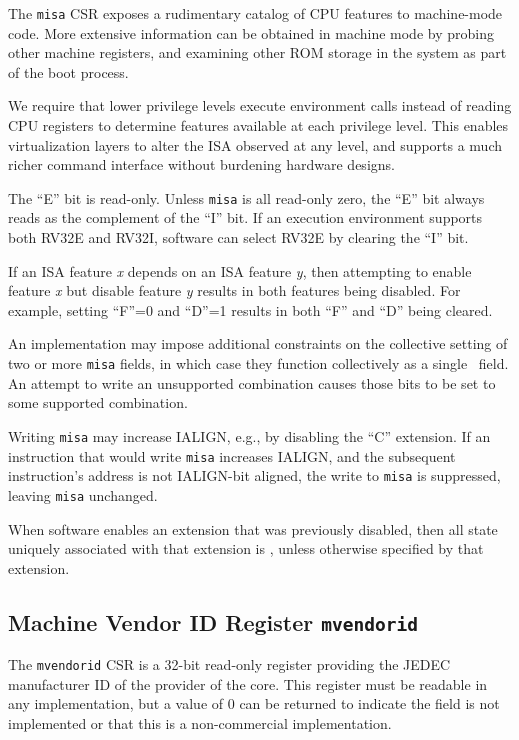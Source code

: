 \begin{commentary}
The {\tt misa} CSR exposes a rudimentary catalog of CPU features
to machine-mode code.  More extensive information can be obtained in
machine mode by probing other machine registers, and examining other
ROM storage in the system as part of the boot process.

We require that lower privilege levels execute environment calls
instead of reading CPU registers to determine features available at
each privilege level. This enables virtualization layers to alter the
ISA observed at any level, and supports a much richer command
interface without burdening hardware designs.
\end{commentary}

The ``E'' bit is read-only.  Unless {\tt misa} is all read-only zero, the ``E''
bit always reads as the complement of the ``I'' bit.
If an execution environment supports both RV32E and RV32I,
software can select RV32E by clearing the ``I'' bit.

If an ISA feature {\em x} depends on an ISA feature {\em y}, then attempting
to enable feature {\em x} but disable feature {\em y} results in both features
being disabled.  For example, setting ``F''=0 and ``D''=1 results in both
``F'' and ``D'' being cleared.

An implementation may impose additional constraints on the collective setting
of two or more {\tt misa} fields, in which case they function collectively as
a single \warl\ field.  An attempt to write an unsupported combination causes
those bits to be set to some supported combination.

Writing {\tt misa} may increase IALIGN, e.g., by disabling the ``C''
extension.
If an instruction that would write {\tt misa} increases IALIGN, and
the subsequent instruction's address is not IALIGN-bit aligned, the
write to {\tt misa} is suppressed, leaving {\tt misa} unchanged.

When software enables an extension that was previously disabled, then all
state uniquely associated with that extension is \unspecified, unless
otherwise specified by that extension.

\subsection{Machine Vendor ID Register {\tt mvendorid}}

The {\tt mvendorid} CSR is a 32-bit read-only register providing
the JEDEC manufacturer ID of the provider of the core.  This register
must be readable in any implementation, but a value of 0 can be
returned to indicate the field is not implemented or that this is a
non-commercial implementation.

